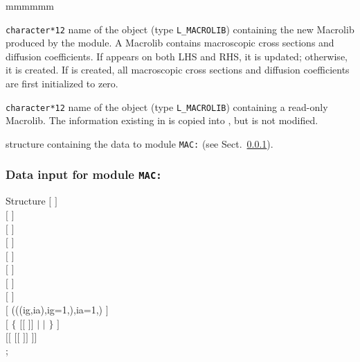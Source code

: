 \begin{ListeDeDescription}{mmmmmm}

\item[\dusa{MACR1}] {\tt character*12} name of the  object (type {\tt L\_MACROLIB}) containing the new Macrolib
produced by the module. A Macrolib contains macroscopic cross sections and diffusion coefficients.
If  appears on both LHS and RHS, it is updated; otherwise, it is
created. If  is created, all macroscopic cross sections and
diffusion coefficients are first initialized to zero.

\item[\dusa{MACR2}] {\tt character*12} name of the  object (type {\tt L\_MACROLIB}) containing a read-only
Macrolib. The information existing in  is copied into , but  is not modified.

\item[\dstr{mac\_data}] structure containing the data to module {\tt MAC:} (see Sect.~\ref{sect:mac_data}).

\end{ListeDeDescription}

\vskip 0.2cm

\subsubsection{Data input for module {\tt MAC:}}\label{sect:mac_data}

\begin{DataStructure}{Structure }
$[$   $]$ \\
$[$   $]$ \\
$[$   $]$ \\
$[$   $]$ \\
$[$   $]$ \\
$[$   $]$ \\
$[$   $]$ \\
$[$   $]$ \\
$[$   (((ig,ia),ig=1,),ia=1,) $]$ \\
$[$   $\{$ $[[$  $]]$ $|$   $|$   $\}$ $]$ \\
$[[$     $[[$  $]]$ $]]$ \\
;
\end{DataStructure}

